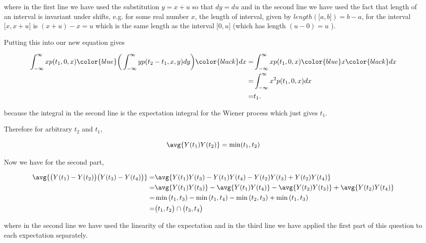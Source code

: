 where in the first line we have used the substitution $y = x + u$ so that $dy = du$ and in the second line we have used the fact that length of an interval is invariant under shifts, e.g. for some real number $x$, the length of interval, given by $length(\big[a, b \big]) = b - a$, for the interval $ \big[x, x + u  \big] $ is $(x + u) - x = u$ which is the same length as the interval $ \big[0, u  \big] $ (which has length $(u - 0) = u$ ). 

Putting this into our new equation gives 

\begin{align*}
\int_{-\infty}^{\infty} x p(t_1, 0, x) \color{blue} \bigg( \int_{-\infty}^{\infty} y p(t_2 - t_1, x, y)dy \bigg) \color{black} dx =& \int_{-\infty}^{\infty} x p(t_1, 0, x) \color{blue} x \color{black} dx \\
= & \int_{-\infty}^{\infty} x^2 p(t_1, 0, x) dx\\
= & t_1 .
\end{align*}

because the integral in the second line is the expectation integral for the Wiener process which just gives $t_1$.

Therefore for arbitrary $t_2$ and $t_1$, 

\begin{equation*}
\avg{Y(t_1)Y(t_2)} = \min(t_1, t_2)
\end{equation*}

Now we have for the second part, 

\begin{align*}
\avg{ \big( Y(t_1) - Y(t_2) \big)  \big( Y(t_3) - Y(t_4) \big) } =& \avg{ Y(t_1)Y(t_3) - Y(t_1)Y(t_4) - Y(t_2)Y(t_3) + Y(t_2)Y(t_4) } \\
= & \avg{Y(t_1)Y(t_3) } - \avg{Y(t_1)Y(t_4)} - \avg{Y(t_2)Y(t_3)} + \avg{ Y(t_2)Y(t_4)}  \\
= & \min{(t_1,t_3)} - \min{(t_1,t_4)} - \min{(t_2,t_3)} + \min{(t_1,t_3)}  \\
= & \big( t_1, t_2 \big) \cap \big( t_3, t_4 \big)
\end{align*}

where in the second line we have used the linearity of the expectation and in the third line we have applied the first part of this question to each expectation separately. 